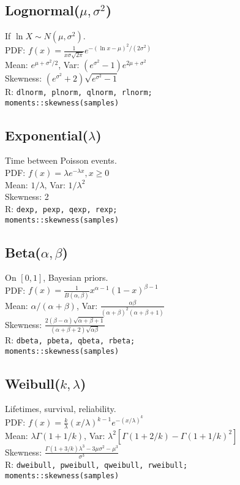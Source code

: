 \documentclass[7pt,landscape]{article}
\begin{document}
\begin{multicols}{3}
\subsection*{Lognormal($\mu,\sigma^2$)}
If $\ln X \sim N(\mu,\sigma^2)$. \\
PDF: $f(x)=\tfrac{1}{x\sigma\sqrt{2\pi}} e^{-(\ln x-\mu)^2/(2\sigma^2)}$ \\
Mean: $e^{\mu+\sigma^2/2}$, Var: $(e^{\sigma^2}-1)e^{2\mu+\sigma^2}$ \\
Skewness: $(e^{\sigma^2}+2)\sqrt{e^{\sigma^2}-1}$ \\
R: \texttt{dlnorm, plnorm, qlnorm, rlnorm; \\
moments::skewness(samples)}

\subsection*{Exponential($\lambda$)}
Time between Poisson events. \\
PDF: $f(x)=\lambda e^{-\lambda x}, x\ge0$ \\
Mean: $1/\lambda$, Var: $1/\lambda^2$ \\
Skewness: 2 \\
R: \texttt{dexp, pexp, qexp, rexp; \\
moments::skewness(samples)}

\subsection*{Beta($\alpha,\beta$)}
On $[0,1]$, Bayesian priors. \\
PDF: $f(x)=\tfrac{1}{B(\alpha,\beta)} x^{\alpha-1}(1-x)^{\beta-1}$ \\
Mean: $\alpha/(\alpha+\beta)$, Var: $\tfrac{\alpha\beta}{(\alpha+\beta)^2(\alpha+\beta+1)}$ \\
Skewness: $\frac{2(\beta-\alpha)\sqrt{\alpha+\beta+1}}{(\alpha+\beta+2)\sqrt{\alpha\beta}}$ \\
R: \texttt{dbeta, pbeta, qbeta, rbeta; \\
moments::skewness(samples)}

\subsection*{Weibull($k,\lambda$)}
Lifetimes, survival, reliability. \\
PDF: $f(x)=\tfrac{k}{\lambda}(x/\lambda)^{k-1} e^{-(x/\lambda)^k}$ \\
Mean: $\lambda \Gamma(1+1/k)$, Var: $\lambda^2[\Gamma(1+2/k)-\Gamma(1+1/k)^2]$ \\
Skewness: $\frac{\Gamma(1+3/k)\lambda^3 - 3\mu\sigma^2 - \mu^3}{\sigma^3}$ \\
R: \texttt{dweibull, pweibull, qweibull, rweibull; \\
moments::skewness(samples)}


\end{multicols}
\end{document}

